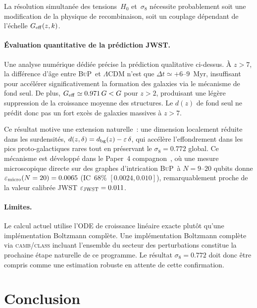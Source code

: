 \documentclass[11pt]{article}
\newcommand{\eps}{\varepsilon}
\newcommand{\Geff}{G_{\rm eff}}
\newcommand{\sig}{\sigma_8}
\newcommand{\LCDM}{\Lambda\mathrm{CDM}}
\newcommand{\BuP}{\textsc{BuP}}
\newcommand{\camb}{\textsc{camb}}
\begin{document}
La résolution simultanée des tensions~$H_0$ et~$\sig$ nécessite
probablement soit une modification de la physique de recombinaison,
soit un couplage dépendant de l'échelle $\Geff(z, k)$.


\paragraph{Évaluation quantitative de la prédiction JWST.}
Une analyse numérique dédiée précise la prédiction qualitative ci-dessus.
À $z > 7$, la différence d'âge entre \BuP\ et $\LCDM$ n'est que
$\Delta t \simeq +6$--$9$~Myr, insuffisant pour accélérer significativement
la formation des galaxies via le mécanisme de fond seul. De plus,
$\Geff \simeq 0.971\,G < G$ pour $z > 2$, produisant une légère
suppression de la croissance moyenne des structures. Le $d(z)$ de fond
seul ne prédit donc pas un fort excès de galaxies massives à $z > 7$.

Ce résultat motive une extension naturelle~: une dimension localement
réduite dans les surdensités, $d(z,\delta) = d_{\rm bg}(z) - \eps\,\delta$,
qui accélère l'effondrement dans les pics proto-galactiques rares tout
en préservant le $\sig = 0.772$ global. Ce mécanisme est développé dans
le Paper~4 compagnon~\cite{hamdad2026p4}, où une mesure microscopique
directe sur des graphes d'intrication \BuP\ à $N=9$--$20$ qubits donne
$\eps_{\rm micro}(N=20) = 0.0065$ (IC~68\% $[0.0024, 0.010]$),
remarquablement proche de la valeur calibrée JWST $\eps_{\rm JWST} = 0.011$.

\paragraph{Limites.}
Le calcul actuel utilise l'ODE de croissance linéaire exacte plutôt
qu'une implémentation Boltzmann complète.
Une implémentation Boltzmann complète via \camb/\textsc{class}
incluant l'ensemble du secteur des perturbations constitue la
prochaine étape naturelle de ce programme.
Le résultat $\sig = 0.772$ doit donc être compris comme une estimation
robuste en attente de cette confirmation.

\section{Conclusion}
\end{document}
